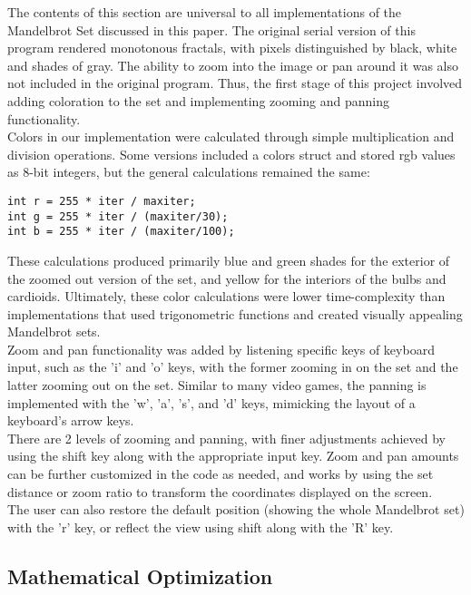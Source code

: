 \documentclass{article}
\begin{document}
The contents of this section are universal to all implementations of the Mandelbrot Set discussed in this paper. The original serial version of this program rendered monotonous fractals, with pixels distinguished by black, white and shades of gray. The ability to zoom into the image or pan around it was also not included in the original program. Thus, the first stage of this project involved adding coloration to the set and implementing zooming and panning functionality.\\

Colors in our implementation were calculated through simple multiplication and division operations. Some versions included a colors struct and stored rgb values as 8-bit integers, but the general calculations remained the same:

\begin{verbatim}
int r = 255 * iter / maxiter;
int g = 255 * iter / (maxiter/30);
int b = 255 * iter / (maxiter/100);
\end{verbatim}

These calculations produced primarily blue and green shades for the exterior of the zoomed out version of the set, and yellow for the interiors of the bulbs and cardioids. Ultimately, these color calculations were lower time-complexity than implementations that used trigonometric functions and created visually appealing Mandelbrot sets. \\

Zoom and pan functionality was added by listening specific keys of keyboard input, such as the 'i' and 'o' keys, with the former zooming in on the set and the latter zooming out on the set. Similar to many video games, the panning is implemented with the 'w', 'a', 's', and 'd' keys, mimicking the layout of a keyboard's arrow keys. \\

There are 2 levels of zooming and panning, with finer adjustments achieved by using the shift key along with the appropriate input key. Zoom and pan amounts can be further customized in the code as needed, and works by using the set distance or zoom ratio to transform the coordinates displayed on the screen.\\

The user can also restore the default position (showing the whole Mandelbrot set) with the 'r' key, or reflect the view using shift along with the 'R' key.

\subsection{Mathematical Optimization}
\end{document}
